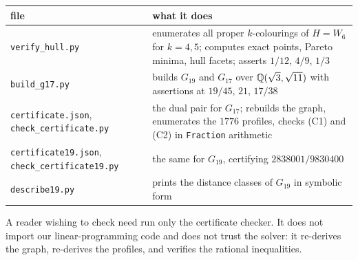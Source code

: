 \begin{center}
\begin{tabular}{@{}lp{7.4cm}@{}}
\toprule
file & what it does \\
\midrule
\texttt{verify\_hull.py} & enumerates all proper $k$-colourings of $H=W_6$ for
$k=4,5$; computes exact points, Pareto minima, hull facets; asserts $1/12$,
$4/9$, $1/3$ \\
\texttt{build\_g17.py} & builds $G_{19}$ and $G_{17}$ over
$\mathbb{Q}(\sqrt3,\sqrt{11})$ with assertions at $19/45$, $21$, $17/38$ \\
\texttt{certificate.json}, \texttt{check\_certificate.py} & the dual pair for
$G_{17}$; rebuilds the graph, enumerates the $1776$ profiles, checks (C1) and
(C2) in \texttt{Fraction} arithmetic \\
\texttt{certificate19.json}, \texttt{check\_certificate19.py} & the same for
$G_{19}$, certifying $2838001/9830400$ \\
\texttt{describe19.py} & prints the distance classes of $G_{19}$ in symbolic
form \\
\bottomrule
\end{tabular}
\end{center}

A reader wishing to check  need run only the certificate
checker. It does not import our linear-programming code and does not trust the
solver: it re-derives the graph, re-derives the profiles, and verifies the
rational inequalities.

